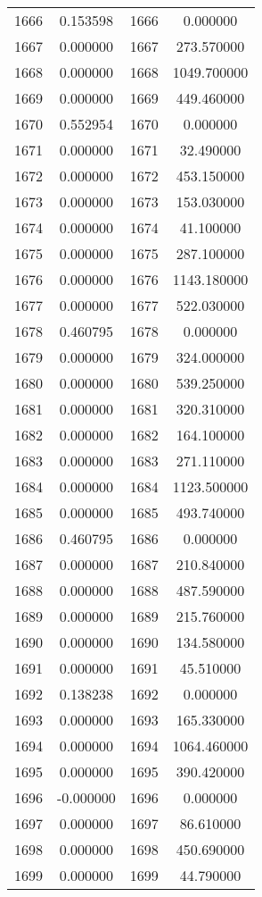 \documentclass[12pt]{article}
\begin{document}
\begin{longtable}{@{}cccc@{}}
1666 & 0.153598 & 1666 & 0.000000 \\
1667 & 0.000000 & 1667 & 273.570000 \\
1668 & 0.000000 & 1668 & 1049.700000 \\
1669 & 0.000000 & 1669 & 449.460000 \\
1670 & 0.552954 & 1670 & 0.000000 \\
1671 & 0.000000 & 1671 & 32.490000 \\
1672 & 0.000000 & 1672 & 453.150000 \\
1673 & 0.000000 & 1673 & 153.030000 \\
1674 & 0.000000 & 1674 & 41.100000 \\
1675 & 0.000000 & 1675 & 287.100000 \\
1676 & 0.000000 & 1676 & 1143.180000 \\
1677 & 0.000000 & 1677 & 522.030000 \\
1678 & 0.460795 & 1678 & 0.000000 \\
1679 & 0.000000 & 1679 & 324.000000 \\
1680 & 0.000000 & 1680 & 539.250000 \\
1681 & 0.000000 & 1681 & 320.310000 \\
1682 & 0.000000 & 1682 & 164.100000 \\
1683 & 0.000000 & 1683 & 271.110000 \\
1684 & 0.000000 & 1684 & 1123.500000 \\
1685 & 0.000000 & 1685 & 493.740000 \\
1686 & 0.460795 & 1686 & 0.000000 \\
1687 & 0.000000 & 1687 & 210.840000 \\
1688 & 0.000000 & 1688 & 487.590000 \\
1689 & 0.000000 & 1689 & 215.760000 \\
1690 & 0.000000 & 1690 & 134.580000 \\
1691 & 0.000000 & 1691 & 45.510000 \\
1692 & 0.138238 & 1692 & 0.000000 \\
1693 & 0.000000 & 1693 & 165.330000 \\
1694 & 0.000000 & 1694 & 1064.460000 \\
1695 & 0.000000 & 1695 & 390.420000 \\
1696 & -0.000000 & 1696 & 0.000000 \\
1697 & 0.000000 & 1697 & 86.610000 \\
1698 & 0.000000 & 1698 & 450.690000 \\
1699 & 0.000000 & 1699 & 44.790000 \\

\end{longtable}
\end{document}
